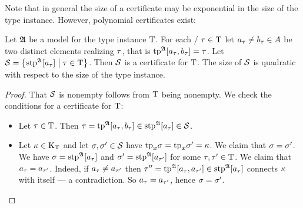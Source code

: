 Note that in general the size of a certificate may be exponential in
the size of the type instance. However, polynomial certificates exist:
\begin{lemma}\label{lem:cert-extract}
Let $\mathfrak{A}$ be a model for the type instance $\mathrm{T}$.
For each \twotype/ $\tau\in\mathrm{T}$ let $a_{\tau} \neq b_{\tau} \in A$
be two distinct elements realizing $\tau$, that is
$\operatorname{tp}^{\mathfrak{A}}[a_{\tau},b_{\tau}] = \tau$.
Let $\mathcal{S} = \left\{\operatorname{stp}^{\mathfrak{A}}[a_{\tau}]\mathrel{}\middle|\mathrel{}\tau \in \mathrm{T}\right\}$.
Then $\mathcal{S}$ is a certificate for $\mathrm{T}$.
The size of $\mathcal{S}$ is quadratic with respect to the size of the type instance.
\end{lemma}
\begin{proof}
That $\mathcal{S}$ is nonempty follows from $\mathrm{T}$ being nonempty.
We check the conditions for a certificate for $\mathrm{T}$:
\begin{itemize}
  \item[\refcondcertT]
  Let $\tau\in\mathrm{T}$.
  Then $\tau=\operatorname{tp}^{\mathfrak{A}}[a_{\tau},b_{\tau}] \in \operatorname{stp}^{\mathfrak{A}}[a_{\tau}] \in
  \mathcal{S}$.
  \item[\refcondcertk]
  Let $\kappa\in{\mathrm{K}}_{\mathrm{T}}$ and let $\sigma,{\sigma'} \in \mathcal{S}$ have
  $\mathrm{tp}_{\bm{x}}\sigma = \mathrm{tp}_{\bm{x}}{\sigma'} = \kappa$. We claim that $\sigma = {\sigma'}$.
  We have $\sigma=\operatorname{stp}^{\mathfrak{A}}[a_{\tau}]$ and ${\sigma'}=\operatorname{stp}^{\mathfrak{A}}[a_{{\tau'}}]$
  for some $\tau,{\tau'}\in\mathrm{T}$.
  We claim that $a_{\tau}=a_{{\tau'}}$. Indeed, if $a_{\tau}\neq a_{{\tau'}}$ then
  ${\tau''} = \operatorname{tp}^{\mathfrak{A}}[a_{\tau},a_{{\tau'}}] \in \operatorname{stp}^{\mathfrak{A}}[a_{\tau}]$ connects
  $\kappa$ with itself --- a contradiction.
  So $a_{\tau} = a_{{\tau'}}$, hence $\sigma={\sigma'}$.
\end{itemize}
\end{proof}

